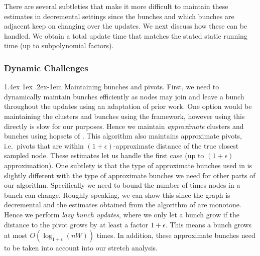 \documentclass[11pt]{article}
\makeatletter
\theoremstyle{definition}
\theoremstyle{remark}
\newcommand{\ttodo}[1]{\todo[color=orange!20]{T: #1}}
\newcommand{\mtodo}[1]{\todo[color=red!20]{M: #1}}
\renewcommand{\paragraph}{%
  \@startsection{paragraph}{4}%
  {\z@}{1.4ex \@plus 1ex \@minus .2ex}{-1em}%
  {\normalfont\normalsize\bfseries}%
}
\makeatother
\begin{document}

There are several subtleties that make it more difficult to maintain these estimates in decremental settings since the bunches and which bunches are adjacent keep on changing over the updates. We next discuss how these can be handled. We obtain a total update time that matches the stated static running time (up to subpolynomial factors). %

    
\subsubsection{Dynamic Challenges}\label{sec:overview_dynamic}
\paragraph{Maintaining bunches and pivots.}
First, we need to dynamically maintain bunches efficiently as nodes may join and leave a bunch throughout the updates using an adaptation of prior work. One option would be maintaining the clusters and bunches using the \cite{RZ12} framework, however using this directly is slow for our purposes. Hence we maintain \textit{approximate} clusters and bunches using hopsets of \cite{LN2020}. This algorithm also maintains approximate pivots, i.e.~pivots that are within $(1+\epsilon)$-approximate distance of the true closest sampled node. These estimates let us handle the first case (up to $(1+\epsilon)$ approximation).
One subtlety is that the type of approximate bunches used in \cite{LN2020} is slightly different with the type of approximate bunches we need for other parts of our algorithm. Specifically we need to bound the number of times nodes in a bunch can change. Roughly speaking, we can show this since the graph is decremental and the estimates obtained from the algorithm of \cite{LN2020} are monotone. Hence we perform \emph{lazy bunch updates}, where we only let a bunch grow if the distance to the pivot grows by at least a factor $1+\epsilon$. This means a bunch grows at most $O(\log_{1+\epsilon}(nW))$ times. In addition, these approximate bunches need to be taken into account into our stretch analysis. 
\end{document}
